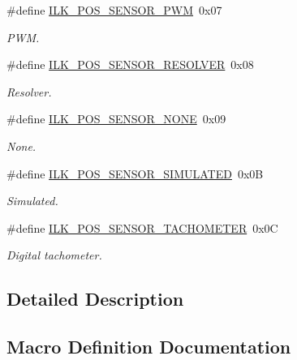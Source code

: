 \begin{DoxyCompactItemize}
\#define \hyperlink{group__IL__CONST__POS__SENSOR_gad60267efbd76b9f67e581b7b58477fab}{I\+L\+K\+\_\+\+P\+O\+S\+\_\+\+S\+E\+N\+S\+O\+R\+\_\+\+P\+WM}~0x07
\begin{DoxyCompactList}\small\item\em P\+WM. \end{DoxyCompactList}\item 
\#define \hyperlink{group__IL__CONST__POS__SENSOR_ga2b72626eee8054c3bae2d4b787a29773}{I\+L\+K\+\_\+\+P\+O\+S\+\_\+\+S\+E\+N\+S\+O\+R\+\_\+\+R\+E\+S\+O\+L\+V\+ER}~0x08
\begin{DoxyCompactList}\small\item\em Resolver. \end{DoxyCompactList}\item 
\#define \hyperlink{group__IL__CONST__POS__SENSOR_ga92cd1904ad594cbfc972210a456020e2}{I\+L\+K\+\_\+\+P\+O\+S\+\_\+\+S\+E\+N\+S\+O\+R\+\_\+\+N\+O\+NE}~0x09
\begin{DoxyCompactList}\small\item\em None. \end{DoxyCompactList}\item 
\#define \hyperlink{group__IL__CONST__POS__SENSOR_ga4500e1b8522b1088b4b6d5061eee2d8e}{I\+L\+K\+\_\+\+P\+O\+S\+\_\+\+S\+E\+N\+S\+O\+R\+\_\+\+S\+I\+M\+U\+L\+A\+T\+ED}~0x0B
\begin{DoxyCompactList}\small\item\em Simulated. \end{DoxyCompactList}\item 
\#define \hyperlink{group__IL__CONST__POS__SENSOR_gadf9c1c973f6b28915598b69515406a0e}{I\+L\+K\+\_\+\+P\+O\+S\+\_\+\+S\+E\+N\+S\+O\+R\+\_\+\+T\+A\+C\+H\+O\+M\+E\+T\+ER}~0x0C
\begin{DoxyCompactList}\small\item\em Digital tachometer. \end{DoxyCompactList}\end{DoxyCompactItemize}


\subsection{Detailed Description}


\subsection{Macro Definition Documentation}
